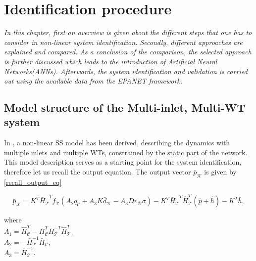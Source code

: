 \chapter{Identification procedure}
\label{identification_procedure}

\emph{In this chapter, first an overview is given about the different steps that one has to consider in non-linear system identification. Secondly, different approaches are explained and compared. As a conclusion of the comparison, the selected approach is further discussed which leads to the introduction of Artificial Neural Networks(ANNs). Afterwards, the system identification and validation is carried out using the available data from the EPANET framework.}

\section{Model structure of the Multi-inlet, Multi-WT system}
\label{model_structure_of_the_multi_inlet_multi_WT_system}

In , a non-linear SS model has been derived, describing the dynamics with multiple inlets and multiple WTs, constrained by the static part of the network. This model description serves as a starting point for the system identification, therefore let us recall the output equation. The output vector $\bar{p}_{\mathcal{K}}$ is given by \eqref{recall_output_eq}

\begin{equation}
  \label{recall_output_eq}
  \bar{p}_{\mathcal{K}} = K^T \bar{H}^{-T}_{\mathcal{T}}f_{\mathcal{T}}(A_2 q_\mathcal{C} + A_3 K \bar{d}_{\mathcal{K}} - A_3 D v_{\mathcal{D}} \sigma) - K^T\bar{H}^{-T}_{\mathcal{T}}\hat{H}^{T}_{\mathcal{T}} (\hat{p} + \hat{h}) - K^T\bar{h} ,
\end{equation} 

\begin{minipage}[t]{0.4\textwidth}
where\\
\hspace*{8mm} $A_1 = \hat{H}^T_{\mathcal{C}} -\bar{H}^T_{\mathcal{C}}\bar{H}^{-T}_{\mathcal{T}}\hat{H}^T_{\mathcal{T}}$, \vspace*{1.5mm}  \\
\hspace*{8mm} $A_2 = -\bar{H}^{-1}_{\mathcal{T}} \bar{H}_{\mathcal{C}} $, \vspace*{1.5mm}\\
\hspace*{8mm} $A_3 = \bar{H}^{-1}_{\mathcal{T}}$.
\end{minipage}

